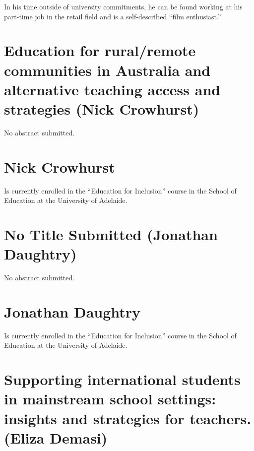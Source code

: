 \documentclass[twoside,14pt,a4paper,notitlepage]{memoir}
\begin{document}
In his time outside of university commitments, he can be found working at his part-time job in the retail field and is a self-described “film enthusiast.”



\section*{Education for rural/remote communities in Australia and alternative teaching access and strategies (Nick Crowhurst)}
\label{aut:crowhurst}

No abstract submitted.

\section*{Nick Crowhurst}

Is currently enrolled in the ``Education for Inclusion'' course in the School of Education at the University of Adelaide.



\section*{No Title Submitted (Jonathan Daughtry)}
\label{aut:daughtry}

No abstract submitted.

\section*{Jonathan Daughtry}

Is currently enrolled in the ``Education for Inclusion'' course in the School of Education at the University of Adelaide.



\section*{Supporting international students in mainstream school settings: insights and strategies for teachers. (Eliza Demasi)}
\label{aut:demasi}
\end{document}
